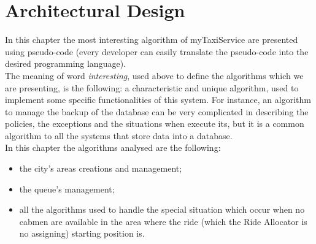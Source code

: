 \documentclass[\mainpath/main]{subfiles}
\begin{document}
\chapter{Architectural Design}
\label{architectural_design}

\setmyfancystyle

In this chapter the most interesting algorithm of myTaxiService are presented using pseudo-code (every developer can easily translate the pseudo-code into the desired programming language).\\
The meaning of word \textit{interesting}, used above to define the algorithms which we are presenting, is the following: a characteristic and unique algorithm, used to implement some specific functionalities of this system. For instance, an algorithm to manage the backup of the database can be very complicated in describing the policies, the exceptions and the situations when execute its, but it is a common algorithm to all the systems that store data into a database.\\
In this chapter the algorithms analysed are the following:\\
\begin{itemize}
	\item the city's areas creations and management;
	\item the queue's management;
	\item all the algorithms used to handle the special situation which occur when no cabmen are available in the area where the ride (which the Ride Allocator is no assigning) starting position is.
\end{itemize}
\end{document}
